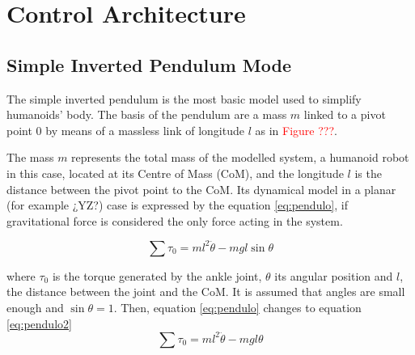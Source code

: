\chapter{Control Architecture}
\section{Simple Inverted Pendulum Mode}
The simple inverted pendulum is the most basic model used to simplify humanoids' body. The basis of the pendulum are a mass $m$ linked to a pivot point $0$ by means of a massless link of longitude $l$ as in \textcolor{red}{Figure ???}.

The mass $m$ represents the total mass of the modelled system, a humanoid robot in this case, located at its Centre of Mass (CoM), and the longitude $l$ is the distance between the pivot point to the CoM. Its dynamical model in a planar (for example ¿YZ?) case is expressed by the equation \ref{eq:pendulo}, if gravitational force is considered the only force acting in the system.

\begin{equation}
\sum{\tau_0} = ml^2 \ddot{\theta} - mgl\sin\theta
\label{eq:pendulo}
\end{equation}

where $\tau_0$ is the torque generated by the ankle joint, $\theta$ its angular position and $l$, the distance between the joint and the CoM. It is assumed that angles are small enough and $\sin\theta = 1$. Then, equation \ref{eq:pendulo} changes to equation \ref{eq:pendulo2}
\begin{equation}
\sum{\tau_0} = ml^2 \ddot{\theta} - mgl\theta
\label{eq:pendulo2}
\end{equation}

